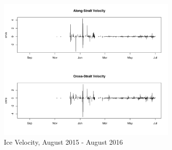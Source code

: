 \documentclass[12pt]{dforeport}
\begin{document}
\begin{figure}  
\centering
\includegraphics[width = 0.8\textwidth]{./figures/70_iceVel_2015_2016.png}
\caption[Ice Velocity, 2015-2016]{Ice Velocity, August 2015 - August 2016}
\label{f:ivel_2015_2016}
\end{figure}
\end{document}
